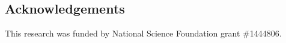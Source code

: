 \documentclass[]{pagposter}
\begin{document}
\begin{multicols*}{3}

  \nocite{*} %


  \subsection*{Acknowledgements}
  
  \noindent \smallish This research was funded by National Science Foundation grant \#1444806.

\end{multicols*}
\end{document}
